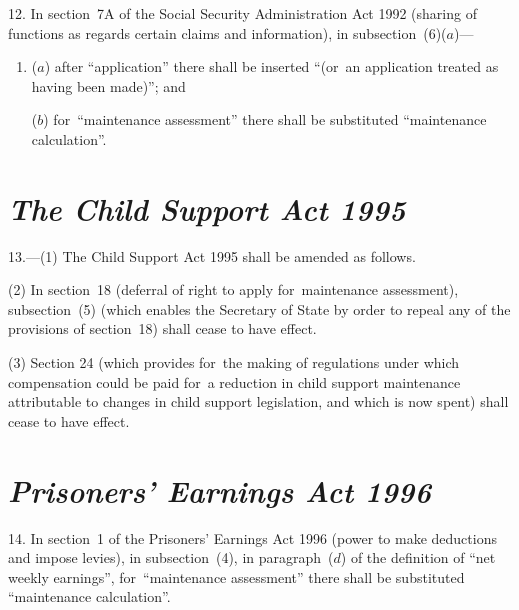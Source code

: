 \documentclass[12pt,a4paper]{article}
\begin{document}
12. In section~7A of the Social Security Administration Act 1992 (sharing of functions as regards certain claims and information), in subsection~(6)($a$)—
\begin{enumerate}\item[]
($a$) after “application” there shall be inserted “(or~an application treated as having been made)”; and

($b$) for~“maintenance assessment” there shall be substituted “maintenance calculation”.
\end{enumerate}


\section*{\itshape The Child Support Act 1995}

13.---(1) The Child Support Act 1995 shall be amended as follows.

(2) In section~18 (deferral of right to apply for~maintenance assessment), subsection~(5)  (which enables the Secretary of State by order to repeal any of the provisions of section~18) shall cease to have effect.

(3) Section 24 (which provides for~the making of regulations under which compensation could be paid for~a reduction in child support maintenance attributable to changes in child support legislation, and which is now spent) shall cease to have effect.


\section*{\itshape Prisoners' Earnings Act 1996}

14. In section~1 of the Prisoners' Earnings Act 1996 (power to make deductions and impose levies), in subsection~(4), in paragraph~($d$)  of the definition of “net weekly earnings”, for~“maintenance assessment” there shall be substituted “maintenance calculation”.

\end{document}
